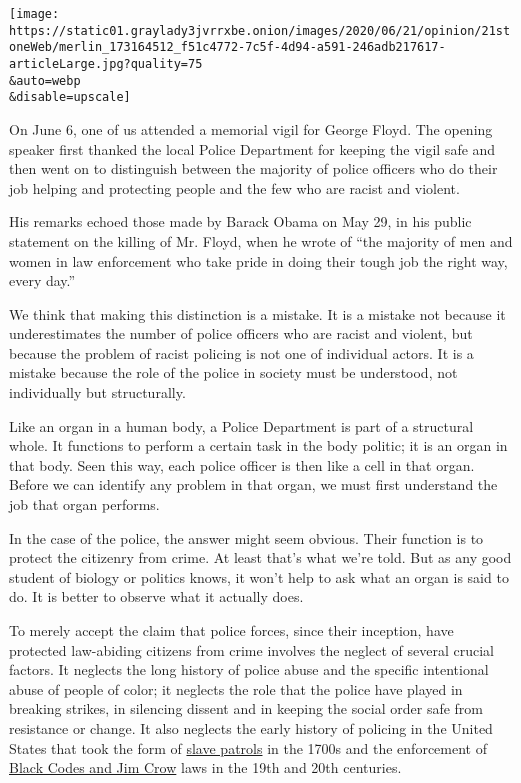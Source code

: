 \texttt{[image: https://static01.graylady3jvrrxbe.onion/images/2020/06/21/opinion/21stoneWeb/merlin\_173164512\_f51c4772-7c5f-4d94-a591-246adb217617-articleLarge.jpg?quality=75\\\&auto=webp\\\&disable=upscale]}

On June 6, one of us attended a memorial vigil for George Floyd. The
opening speaker first thanked the local Police Department for keeping
the vigil safe and then went on to distinguish between the majority of
police officers who do their job helping and protecting people and the
few who are racist and violent.

His remarks echoed those made by Barack Obama on May 29, in his public
statement on the killing of Mr. Floyd, when he wrote of ``the majority
of men and women in law enforcement who take pride in doing their tough
job the right way, every day.''

We think that making this distinction is a mistake. It is a mistake not
because it underestimates the number of police officers who are racist
and violent, but because the problem of racist policing is not one of
individual actors. It is a mistake because the role of the police in
society must be understood, not individually but structurally.

Like an organ in a human body, a Police Department is part of a
structural whole. It functions to perform a certain task in the body
politic; it is an organ in that body. Seen this way, each police officer
is then like a cell in that organ. Before we can identify any problem in
that organ, we must first understand the job that organ performs.

In the case of the police, the answer might seem obvious. Their function
is to protect the citizenry from crime. At least that's what we're told.
But as any good student of biology or politics knows, it won't help to
ask what an organ is said to do. It is better to observe what it
actually does.

To merely accept the claim that police forces, since their inception,
have protected law-abiding citizens from crime involves the neglect of
several crucial factors. It neglects the long history of police abuse
and the specific intentional abuse of people of color; it neglects the
role that the police have played in breaking strikes, in silencing
dissent and in keeping the social order safe from resistance or change.
It also neglects the early history of policing in the United States that
took the form of
\href{https://lawenforcementmuseum.org/2019/07/10/slave-patrols-an-early-form-of-american-policing/}{slave
patrols} in the 1700s and the enforcement of
\href{https://www.nationalgeographic.org/encyclopedia/black-codes-and-jim-crow-laws/}{Black
Codes and Jim Crow} laws in the 19th and 20th centuries.

